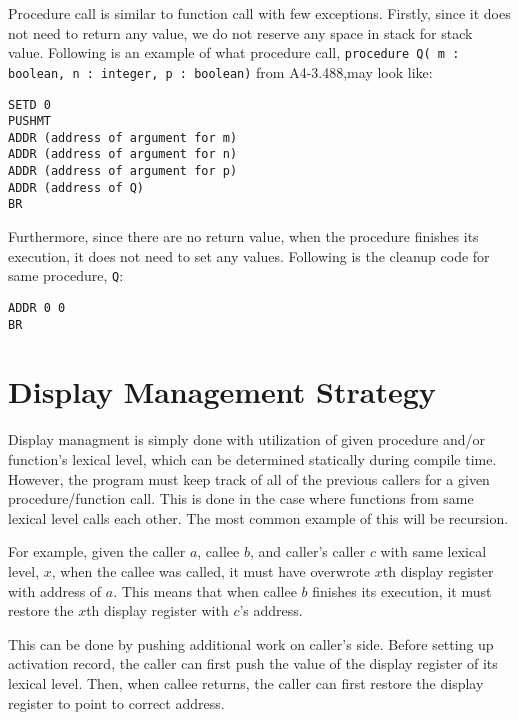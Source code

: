 \documentclass{article}
\begin{document}
Procedure call is similar to function call with few exceptions. Firstly, since it does not need to return any value, we do not reserve any space in stack for stack value. Following is an example of what procedure call, {\tt procedure Q( m : boolean, n : integer, p : boolean)} from A4-3.488,may look like:

\begin{lstlisting}
SETD 0
PUSHMT
ADDR (address of argument for m)
ADDR (address of argument for n)
ADDR (address of argument for p)
ADDR (address of Q)
BR
\end{lstlisting}

Furthermore, since there are no return value, when the procedure finishes its execution, it does not need to set any values. Following is the cleanup code for same procedure, {\tt Q}:

\begin{lstlisting}
ADDR 0 0
BR
\end{lstlisting}

\section{Display Management Strategy} \label{display}

Display managment is simply done with utilization of given procedure and/or function's lexical level, which can be determined statically during compile time. However, the program must keep track of all of the previous callers for a given procedure/function call. This is done in the case where functions from same lexical level calls each other. The most common example of this will be recursion.

For example, given the caller $a$, callee $b$, and caller's caller $c$ with same lexical level, $x$, when the callee was called, it must have overwrote $x$th display register with address of $a$. This means that when callee $b$ finishes its execution, it must restore the $x$th display register with $c$'s address.

This can be done by pushing additional work on caller's side. Before setting up activation record, the caller can first push the value of the display register of its lexical level. Then, when callee returns, the caller can first restore the display register to point to correct address.
\end{document}
